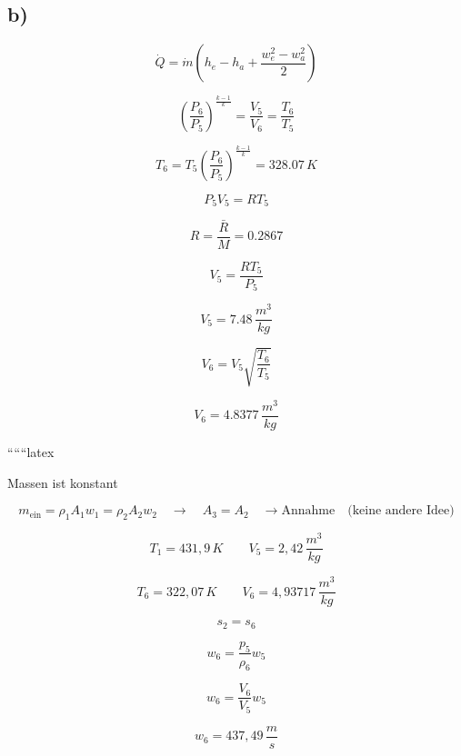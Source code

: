

\subsection*{b)}

\[
\dot{Q} = \dot{m} \left( h_e - h_a + \frac{w_e^2 - w_a^2}{2} \right)
\]

\[
\left( \frac{P_6}{P_5} \right)^{\frac{k-1}{k}} = \frac{V_5}{V_6} = \frac{T_6}{T_5}
\]

\[
T_6 = T_5 \left( \frac{P_6}{P_5} \right)^{\frac{k-1}{k}} = 328.07 \, K
\]

\[
P_5 V_5 = R T_5
\]

\[
R = \frac{\bar{R}}{M} = 0.2867
\]

\[
V_5 = \frac{R T_5}{P_5}
\]

\[
V_5 = 7.48 \, \frac{m^3}{kg}
\]

\[
V_6 = V_5 \sqrt{\frac{T_6}{T_5}}
\]

\[
V_6 = 4.8377 \, \frac{m^3}{kg}
\]

``````latex


Massen ist konstant

\begin{equation}
m_{\text{ein}} = \rho_1 A_1 w_1 = \rho_2 A_2 w_2 \quad \rightarrow \quad A_3 = A_2 \quad \rightarrow \text{Annahme} \quad \text{(keine andere Idee)}
\end{equation}

\begin{equation}
T_1 = 431,9 \, K \quad \quad V_5 = 2,42 \, \frac{m^3}{kg}
\end{equation}

\begin{equation}
T_6 = 322,07 \, K \quad \quad V_6 = 4,93717 \, \frac{m^3}{kg}
\end{equation}

\begin{equation}
s_2 = s_6
\end{equation}

\begin{equation}
w_6 = \frac{p_5}{\rho_6} w_5
\end{equation}

\begin{equation}
w_6 = \frac{V_6}{V_5} w_5
\end{equation}

\begin{equation}
w_6 = 437,49 \, \frac{m}{s}
\end{equation}